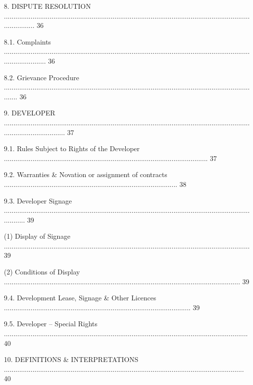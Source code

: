 \documentclass{article}
\begin{document}
{\fontsize{9.99}{1}8. DISPUTE RESOLUTION ................................................................................................................................................. 36 }

{\fontsize{9.99}{1}8.1. Complaints ....................................................................................................................................................... 36 }

{\fontsize{9.99}{1}8.2. Grievance Procedure ........................................................................................................................................ 36 }

{\fontsize{9.99}{1}9. DEVELOPER ................................................................................................................................................................. 37 }

{\fontsize{9.99}{1}9.1. Rules Subject to Rights of the Developer ........................................................................................................... 37 }

{\fontsize{9.99}{1}9.2. Warranties \& Novation or assignment of contracts ........................................................................................... 38 }

{\fontsize{9.99}{1}9.3. Developer Signage ............................................................................................................................................ 39 }

{\fontsize{9.962}{1}(1) Display of Signage ................................................................................................................................. 39 }

{\fontsize{9.962}{1}(2) Conditions of Display ............................................................................................................................ 39 }

{\fontsize{9.99}{1}9.4. Development Lease, Signage \& Other Licences .................................................................................................. 39 }

{\fontsize{9.99}{1}9.5. Developer – Special Rights ................................................................................................................................ 40 }

{\fontsize{9.99}{1}10. DEFINITIONS \& INTERPRETATIONS .............................................................................................................................. 40 }
\end{document}
